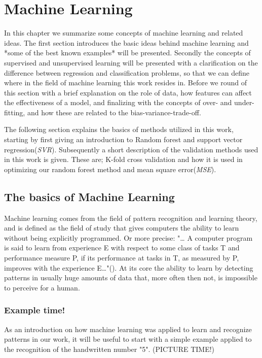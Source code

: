 	
	
\pagebreak
\section{Machine Learning}

In this chapter we summarize some concepts of machine learning and related ideas. The first section introduces the basic ideas behind machine learning and *some of the best known examples* will be presented. Secondly the concepts of supervised and unsupervised learning will be presented with a clarification on the difference between regression and classification problems, so that we can define where in the field of machine learning this work resides in. Before we round of this section with a brief explanation on the role of data, how features can affect the effectiveness of a model, and finalizing with the concepts of over- and under-fitting, and how these are related to the bias-variance-trade-off. 

The following section explains the basics of methods utilized in this work, starting by first giving an introduction to Random forest and support vector regression(\textit{SVR}). Subsequently a short description of the validation methods used in this work is given. These are; K-fold cross validation and how it is used in optimizing our random forest method and mean square error(\textit{MSE}). 



\subsection{The basics of Machine Learning}

Machine learning comes from the field of pattern recognition and learning theory, and is defined as the field of study that gives computers the ability to learn without being explicitly programmed. Or more precise: "… A computer program is said to learn from experience E with respect to some class of tasks T and performance measure P, if its performance at tasks in T, as measured by P, improves with the experience E…"(\cite{mitchell1997machine}). At its core the ability to learn by detecting patterns in usually huge amounts of data that, more often then not, is impossible to perceive for a human. 


	\subsubsection{Example time!}
	As an introduction on how machine learning was applied to learn and recognize patterns in our work, it will be useful to start with a simple example applied to the recognition of the handwritten number "5". (PICTURE TIME!)
	
